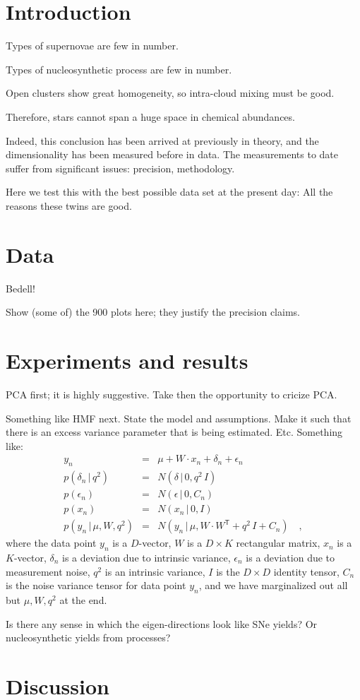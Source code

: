 \documentclass[12pt]{article}
\newcommand{\given}{\,|\,}
\newcommand{\trans}[1]{{#1}^{\!\mathsf{T}}}
\begin{document}
\section{Introduction}

Types of supernovae are few in number.

Types of nucleosynthetic process are few in number.

Open clusters show great homogeneity, so intra-cloud mixing must be good.

Therefore, stars cannot span a huge space in chemical abundances.

Indeed, this conclusion has been arrived at previously in theory, and
the dimensionality has been measured before in data. The measurements to
date suffer from significant issues: precision, methodology.

Here we test this with the best possible data set at the present day:
All the reasons these twins are good.

\section{Data}

Bedell!

Show (some of) the 900 plots here; they justify the precision claims.

\section{Experiments and results}

PCA first; it is highly suggestive. Take then the opportunity to cricize PCA.

Something like HMF next. State the model and assumptions. Make it such that
there is an excess variance parameter that is being estimated. Etc.
Something like:
\begin{eqnarray}
y_n &=& \mu + W\cdot x_n + \delta_n + \epsilon_n
\\
p(\delta_n\given q^2) &=& N(\delta\given 0, q^2\,I)
\\
p(\epsilon_n) &=& N(\epsilon\given 0, C_n)
\\
p(x_n) &=& N(x_n\given 0, I)
\\
p(y_n\given \mu,W,q^2) &=& N(y_n\given \mu, W\cdot\trans{W}+q^2\,I+C_n)
\quad ,
\end{eqnarray}
where the data point $y_n$ is a $D$-vector,
$W$ is a $D\times K$ rectangular matrix,
$x_n$ is a $K$-vector,
$\delta_n$ is a deviation due to intrinsic variance,
$\epsilon_n$ is a deviation due to measurement noise,
$q^2$ is an intrinsic variance,
$I$ is the $D\times D$ identity tensor,
$C_n$ is the noise variance tensor for data point $y_n$,
and we have marginalized out all but $\mu,W,q^2$ at the end.

Is there any sense in which the eigen-directions look like SNe yields?
Or nucleosynthetic yields from processes?

\section{Discussion}
\end{document}
